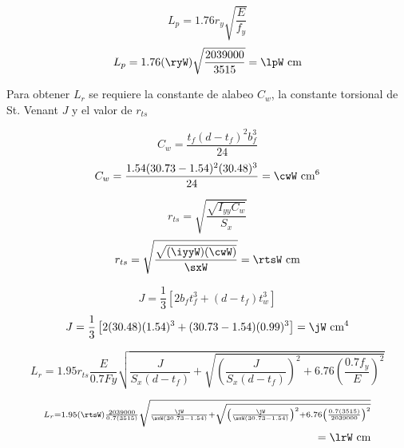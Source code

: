 \documentclass[11pt,a4paper]{article}
\begin{document}
\begin{equation}
	L_p=1.76r_y\sqrt{\frac{E}{f_y}} 
\end{equation}
\begin{align*}
	L_p=1.76(\ryW)\sqrt{\frac{\Ey}{\fy}} =\lpW \text{ cm}
\end{align*}

Para obtener $L_r$ se requiere la constante de alabeo $C_w$, la constante torsional de St. Venant  $J$ y el valor de $r_{ts}$

\begin{equation}
	C_w=\frac{t_f(d-t_f)^2b_f^3}{24} 
\end{equation}
\begin{align*}
	C_w=\frac{\tfW(\dW-\tfW)^2(\bfW)^3}{24}  =\cwW \text{ cm$^6$}
\end{align*}

\begin{equation}
	r_{ts}=\sqrt{\frac{\sqrt{I_{yy}C_w}}{S_x}}
\end{equation}
\begin{align*}
	r_{ts}=\sqrt{\frac{\sqrt{(\iyyW)(\cwW)}}{\sxW}}= \rtsW\text{ cm}
\end{align*}

\begin{equation}
	J=\frac{1}{3}\left[2b_ft_{f}^{3}+(d-t_f)t_w^3 \right]
\end{equation}
\begin{align*}
	J=\frac{1}{3}\left[2(\bfW)(\tfW)^{3}+(\dW-\tfW)(\twW)^3 \right]= \jW\text{ cm$^4$}
\end{align*}

\begin{equation}
	L_r=1.95r_{ts}\frac{E}{0.7Fy}\sqrt{\frac{J}{S_x(d-t_f)}+\sqrt{ \left(\frac{J}{S_x(d-t_f)} \right) ^2+6.76\left(\frac{0.7f_y}{E}\right)^2}}
\end{equation}

\begin{align*}
	 \scriptstyle L_r=1.95(\rtsW)\frac{\Ey}{0.7(\fy)}\sqrt{\frac{\jW}{\sxW(\dW-\tfW)}+\sqrt{ \left(\frac{\jW}{\sxW(\dW-\tfW)} \right) ^2+6.76\left(\frac{0.7(\fy)}{\Ey}\right)^2}}\\
	=\lrW\text{ cm}
\end{align*}
\end{document}
